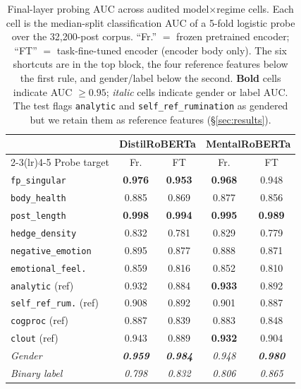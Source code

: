 \documentclass[11pt]{article}
\begin{document}
\begin{table}[t]
\centering
\small
\caption{Final-layer probing AUC across audited model$\times$regime cells. Each cell is the median-split classification AUC of a 5-fold logistic probe over the 32,200-post corpus. ``Fr.'' $=$ frozen pretrained encoder; ``FT'' $=$ task-fine-tuned encoder (encoder body only). The six shortcuts are in the top block, the four reference features below the first rule, and gender/label below the second. \textbf{Bold} cells indicate AUC $\geq 0.95$; \textit{italic} cells indicate gender or label AUC. The test flags \texttt{analytic} and \texttt{self\_ref\_rumination} as gendered but we retain them as reference features (\S\ref{sec:results}).}
\label{tab:probing-multi}
\begin{tabular}{@{}l cc cc@{}}
\toprule
& \multicolumn{2}{c}{\textbf{DistilRoBERTa}} & \multicolumn{2}{c}{\textbf{MentalRoBERTa}} \\
\cmidrule(lr){2-3}\cmidrule(lr){4-5}
Probe target & Fr. & FT & Fr. & FT \\
\midrule
\texttt{fp\_singular}      & \textbf{0.976} & \textbf{0.953} & \textbf{0.968} & 0.948 \\
\texttt{body\_health}      & 0.885 & 0.869 & 0.877 & 0.856 \\
\texttt{post\_length}      & \textbf{0.998} & \textbf{0.994} & \textbf{0.995} & \textbf{0.989} \\
\texttt{hedge\_density}    & 0.832 & 0.781 & 0.829 & 0.779 \\
\texttt{negative\_emotion} & 0.895 & 0.877 & 0.888 & 0.871 \\
\texttt{emotional\_feel.}  & 0.859 & 0.816 & 0.852 & 0.810 \\
\midrule
\texttt{analytic} (ref)    & 0.932 & 0.884 & \textbf{0.933} & 0.892 \\
\texttt{self\_ref\_rum.} (ref) & 0.908 & 0.892 & 0.901 & 0.887 \\
\texttt{cogproc} (ref)     & 0.887 & 0.839 & 0.883 & 0.848 \\
\texttt{clout} (ref)       & 0.943 & 0.889 & \textbf{0.932} & 0.904 \\
\midrule
\textit{Gender}            & \textbf{\textit{0.959}} & \textbf{\textit{0.984}} & \textit{0.948} & \textbf{\textit{0.980}} \\
\textit{Binary label}      & \textit{0.798} & \textit{0.832} & \textit{0.806} & \textit{0.865} \\
\bottomrule
\end{tabular}
\end{table}
\end{document}
